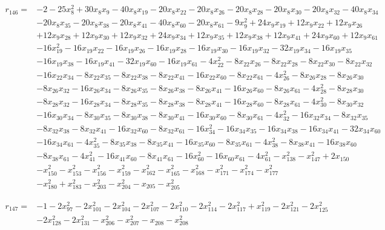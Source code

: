 \documentclass[10pt,letterpaper]{article}
\theoremstyle{remark}\newtheorem{remark}[theorem]{Remark}
\begin{document}
\begin{align*}
r_{146}={}&-2-25x_{8}^{2}+30x_{8}x_{9}-40x_{8}x_{19}-20x_{8}x_{22}-20x_{8}x_{26}-20x_{8}x_{28}-20x_{8}x_{30}-20x_{8}x_{32}-40x_{8}x_{34}\\
&-20x_{8}x_{35}-20x_{8}x_{38}-20x_{8}x_{41}-40x_{8}x_{60}-20x_{8}x_{61}-9x_{9}^{2}+24x_{9}x_{19}+12x_{9}x_{22}+12x_{9}x_{26}\\
&+12x_{9}x_{28}+12x_{9}x_{30}+12x_{9}x_{32}+24x_{9}x_{34}+12x_{9}x_{35}+12x_{9}x_{38}+12x_{9}x_{41}+24x_{9}x_{60}+12x_{9}x_{61}\\
&-16x_{19}^{2}-16x_{19}x_{22}-16x_{19}x_{26}-16x_{19}x_{28}-16x_{19}x_{30}-16x_{19}x_{32}-32x_{19}x_{34}-16x_{19}x_{35}\\
&-16x_{19}x_{38}-16x_{19}x_{41}-32x_{19}x_{60}-16x_{19}x_{61}-4x_{22}^{2}-8x_{22}x_{26}-8x_{22}x_{28}-8x_{22}x_{30}-8x_{22}x_{32}\\
&-16x_{22}x_{34}-8x_{22}x_{35}-8x_{22}x_{38}-8x_{22}x_{41}-16x_{22}x_{60}-8x_{22}x_{61}-4x_{26}^{2}-8x_{26}x_{28}-8x_{26}x_{30}\\
&-8x_{26}x_{32}-16x_{26}x_{34}-8x_{26}x_{35}-8x_{26}x_{38}-8x_{26}x_{41}-16x_{26}x_{60}-8x_{26}x_{61}-4x_{28}^{2}-8x_{28}x_{30}\\
&-8x_{28}x_{32}-16x_{28}x_{34}-8x_{28}x_{35}-8x_{28}x_{38}-8x_{28}x_{41}-16x_{28}x_{60}-8x_{28}x_{61}-4x_{30}^{2}-8x_{30}x_{32}\\
&-16x_{30}x_{34}-8x_{30}x_{35}-8x_{30}x_{38}-8x_{30}x_{41}-16x_{30}x_{60}-8x_{30}x_{61}-4x_{32}^{2}-16x_{32}x_{34}-8x_{32}x_{35}\\
&-8x_{32}x_{38}-8x_{32}x_{41}-16x_{32}x_{60}-8x_{32}x_{61}-16x_{34}^{2}-16x_{34}x_{35}-16x_{34}x_{38}-16x_{34}x_{41}-32x_{34}x_{60}\\
&-16x_{34}x_{61}-4x_{35}^{2}-8x_{35}x_{38}-8x_{35}x_{41}-16x_{35}x_{60}-8x_{35}x_{61}-4x_{38}^{2}-8x_{38}x_{41}-16x_{38}x_{60}\\
&-8x_{38}x_{61}-4x_{41}^{2}-16x_{41}x_{60}-8x_{41}x_{61}-16x_{60}^{2}-16x_{60}x_{61}-4x_{61}^{2}-x_{138}^{2}-x_{147}^{2}+2x_{150}\\
&-x_{150}^{2}-x_{153}^{2}-x_{156}^{2}-x_{159}^{2}-x_{162}^{2}-x_{165}^{2}-x_{168}^{2}-x_{171}^{2}-x_{174}^{2}-x_{177}^{2}\\
&-x_{180}^{2}+x_{183}^{2}-x_{203}^{2}-x_{204}^{2}-x_{205}-x_{205}^{2}
\end{align*}

\begin{align*}
r_{147}={}&-1-2x_{97}^{2}-2x_{101}^{2}-2x_{104}^{2}-2x_{107}^{2}-2x_{110}^{2}-2x_{114}^{2}-2x_{117}^{2}+x_{119}^{2}-2x_{121}^{2}-2x_{125}^{2}\\
&-2x_{128}^{2}-2x_{131}^{2}-x_{206}^{2}-x_{207}^{2}-x_{208}-x_{208}^{2}
\end{align*}
\end{document}

